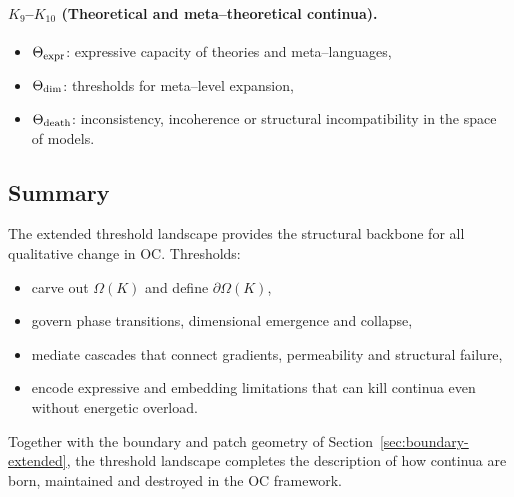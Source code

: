 \paragraph{\texorpdfstring{\(K_9\)}{K_9}–\(K_{10}\) (Theoretical and meta–theoretical continua).}
\begin{itemize}
    \item \(\Theta_{\rm expr}\): expressive capacity of theories and
          meta–languages,
    \item \(\Theta_{\rm dim}\): thresholds for meta–level expansion,
    \item \(\Theta_{\rm death}\): inconsistency, incoherence or structural
          incompatibility in the space of models.
\end{itemize}

\subsection{Summary}

The extended threshold landscape provides the structural backbone for all
qualitative change in OC. Thresholds:
\begin{itemize}
    \item carve out \(\Omega(K)\) and define \(\partial\Omega(K)\),
    \item govern phase transitions, dimensional emergence and collapse,
    \item mediate cascades that connect gradients, permeability and structural
          failure,
    \item encode expressive and embedding limitations that can kill continua
          even without energetic overload.
\end{itemize}

Together with the boundary and patch geometry of
Section~\ref{sec:boundary-extended}, the threshold landscape completes the
description of how continua are born, maintained and destroyed in the OC
framework.
